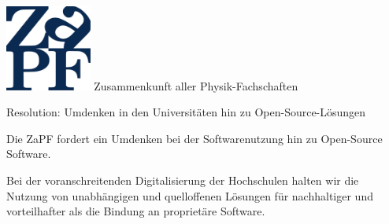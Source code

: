 \documentclass[DIV=calc]{scrartcl}
\begin{document}
\hspace{0.87\textwidth}
\begin{minipage}{120pt}
	\vspace{-1.8cm}
	\includegraphics[width=80pt]{../logo.pdf}
	\centering
	\small Zusammenkunft aller Physik-Fachschaften
\end{minipage}

\begin{center}
  \huge{Resolution: Umdenken in den Universitäten hin zu Open-Source-Lösungen}\vspace{.25\baselineskip}\\
  \normalsize
\end{center}
\vspace{1cm}


 




Die ZaPF fordert ein Umdenken bei der Softwarenutzung hin zu Open-Source Software. 

Bei der voranschreitenden Digitalisierung der Hochschulen halten wir die Nutzung von unabhängigen und quelloffenen Lösungen für nachhaltiger und vorteilhafter als die Bindung an proprietäre Software. 
\end{document}
